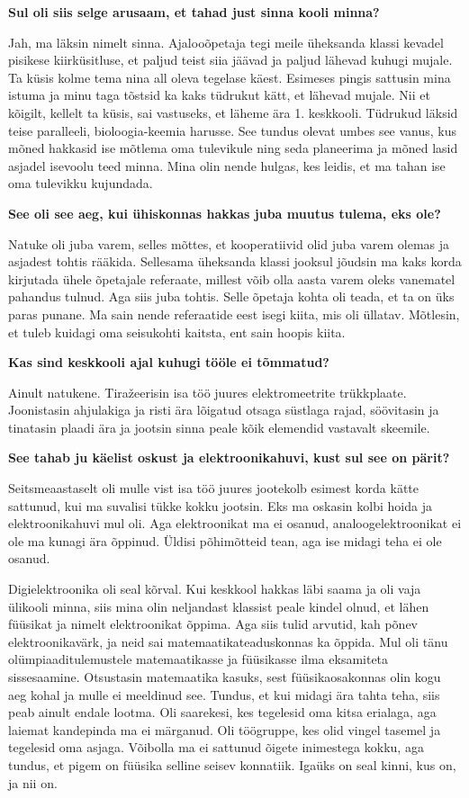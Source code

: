 \textbf{Sul oli siis selge arusaam, et tahad just sinna kooli
minna?}

Jah, ma läksin nimelt sinna. Ajalooõpetaja tegi meile 
üheksanda klassi kevadel pisikese kiirküsitluse, et paljud teist siia jäävad
ja paljud lähevad kuhugi mujale. Ta küsis kolme tema nina all oleva
tegelase käest. Esimeses pingis sattusin mina istuma ja minu taga tõstsid ka kaks
tüdrukut kätt, et lähevad mujale. Nii et kõigilt,
kellelt ta küsis, sai vastuseks, et läheme ära 1. keskkooli. Tüdrukud läksid
teise paralleeli, bioloogia-keemia harusse. See tundus olevat umbes see vanus,
kus mõned hakkasid ise mõtlema oma tulevikule ning seda planeerima ja mõned
lasid asjadel isevoolu teed minna. Mina olin nende hulgas, kes leidis, et ma
tahan ise oma tulevikku kujundada.

\textbf{See oli see aeg, kui ühiskonnas hakkas juba muutus tulema, eks
ole?}

Natuke oli juba varem, selles mõttes, et kooperatiivid olid juba varem olemas
ja asjadest tohtis rääkida. Sellesama üheksanda klassi jooksul jõudsin ma kaks
korda kirjutada ühele õpetajale referaate, millest võib olla aasta varem oleks
vanematel pahandus tulnud. Aga siis juba tohtis. Selle õpetaja kohta oli teada,
et ta on üks paras punane. Ma sain nende referaatide eest isegi kiita, mis oli
üllatav. Mõtlesin, et tuleb kuidagi oma seisukohti kaitsta, ent sain hoopis
kiita.

\textbf{Kas sind keskkooli ajal kuhugi tööle ei tõmmatud?}

Ainult natukene. Tiražeerisin isa töö juures elektromeetrite trükkplaate.
Joonistasin ahjulakiga ja risti ära lõigatud otsaga süstlaga rajad, söövitasin ja tinatasin
plaadi ära ja jootsin sinna peale kõik elemendid vastavalt
skeemile.

\textbf{See tahab ju käelist oskust ja elektroonikahuvi, kust sul
see on pärit?}

Seitsmeaastaselt oli mulle vist isa töö juures jootekolb esimest korda kätte
sattunud, kui ma suvalisi tükke kokku jootsin. Eks ma oskasin kolbi hoida ja
elektroonikahuvi mul oli. Aga elektroonikat ma ei osanud, analoogelektroonikat
ei ole ma kunagi ära õppinud. Üldisi põhimõtteid tean, aga ise midagi teha ei
ole osanud.

Digielektroonika oli seal kõrval. Kui keskkool hakkas läbi saama ja oli vaja
ülikooli minna, siis mina olin neljandast klassist peale kindel olnud, et
lähen füüsikat ja nimelt elektroonikat õppima. Aga siis tulid arvutid, kah
põnev elektroonikavärk, ja neid sai matemaatikateaduskonnas ka õppida. Mul oli tänu olümpiaaditulemustele
matemaatikasse ja füüsikasse ilma eksamiteta sissesaamine. Otsustasin matemaatika kasuks, sest
füüsikaosakonnas olin kogu aeg kohal ja mulle ei meeldinud see. Tundus, et
kui midagi ära tahta teha, siis peab ainult endale lootma. Oli 
saarekesi, kes tegelesid oma kitsa erialaga, aga laiemat kandepinda ma ei
märganud. Oli töögruppe, kes olid vingel tasemel ja tegelesid oma asjaga. Võibolla ma ei sattunud õigete inimestega kokku, aga tundus, et pigem on
füüsika selline seisev konnatiik. Igaüks on seal kinni, kus on, ja nii on.

